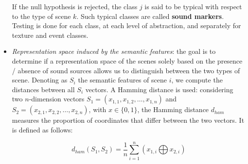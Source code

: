 \documentclass[12pt]{elsarticle}
\begin{document}
\begin{itemize}
If the null hypothesis is rejected, the class $j$ is said to be typical with respect to the type of scene $k$. Such typical classes are called \textbf{sound markers}. Testing is done for each class, at each level of abstraction, and separately for texture and event classes.


\item \emph{Representation space induced by the semantic features}: the goal is to determine if a representation space of the scenes solely based on the presence / absence of sound sources allows us to distinguish between the two types of scene. Denoting as $S_i$ the semantic features of scene $i$, we compute the distances between all $S_i$ vectors. A Hamming distance is used: considering two $n$-dimension vectors $S_1=(x_{1,1},x_{1,2},\ldots,x_{1,n})$ and $S_2=(x_{2,1},x_{2,2},\ldots,x_{2,n})$, with $x \in\lbrace 0,1\rbrace$, the Hamming distance $d_{ham}$ measures the proportion of coordinates that differ between the two vectors. It is defined as follows:

\begin{equation}
d_{ham}(S_1,S_2)=\dfrac{1}{n}\sum_{i=1}^{n} (x_{1,i} \bigoplus x_{2,i})
\end{equation}



\end{itemize}
\end{document}
